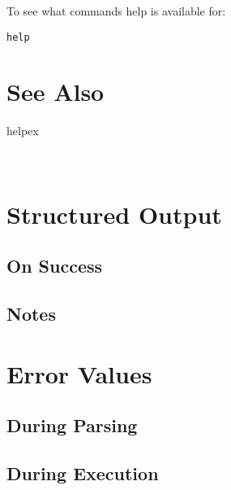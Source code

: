 \documentclass[10pt]{article}
\begin{document}
 To see what commands help is available for: \begin{verbatim}
help

\end{verbatim}

\section*{ See Also }
\begin{description}
helpex

\end{description}


 \\ 

\section*{ Structured Output }
\subsection*{ On Success }
\subsection*{ Notes }
\section*{ Error Values }
\subsection*{ During Parsing }
\subsection*{ During Execution }
\end{document}
